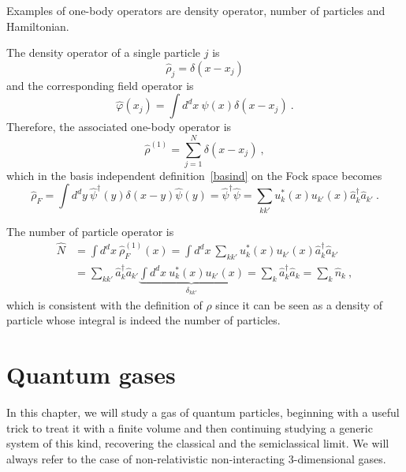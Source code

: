     Examples of one-body operators are density operator, number of particles and Hamiltonian.

    The density operator of a single particle $j$ is 
    \begin{equation*}
        \hat \rho_j = \delta (x - x_j)
    \end{equation*}
    and the corresponding field operator is 
    \begin{equation*}
        \hat \varphi (x_j) = \int d^d x ~ \psi (x) \delta (x - x_j) ~.
    \end{equation*}
    Therefore, the associated one-body operator is 
    \begin{equation*}
        \hat \rho^{(1)} = \sum_{j=1}^{N} \delta (x - x_j) ~,
    \end{equation*}
    which in the basis independent definition~\eqref{basind} on the Fock space becomes
    \begin{equation*}
        \hat \rho_F = \int d^d y ~ \hat \psi^\dagger (y) \delta (x - y) \hat \psi (y) = \hat \psi^\dagger \hat \psi = \sum_{kk'} u_k^* (x) u_{k'} (x) \hat a^\dagger_k \hat a_{k'} ~.
    \end{equation*}

    The number of particle operator is 
    \begin{equation*}
    \begin{aligned}
        \hat N & = \int d^d x ~ \hat \rho^{(1)}_F (x) = \int d^d x ~ \sum_{kk'} u^*_k (x) u_{k'} (x) \hat a^\dagger_k \hat a_{k'} \\ & = \sum_{kk'} \hat a^\dagger_k \hat a_{k'} \underbrace{\int d^d x ~ u^*_k (x) u_{k'} (x)}_{\delta_{kk'}} = \sum_k \hat a^\dagger_k \hat a_k = \sum_k \hat n_k ~,
    \end{aligned}
    \end{equation*}
    which is consistent with the definition of $\rho$ since it can be seen as a density of particle whose integral is indeed the number of particles.

\chapter{Quantum gases}

    In this chapter, we will study a gas of quantum particles, beginning with a useful trick to treat it with a finite volume and then continuing studying a generic system of this kind, recovering the classical and the semiclassical limit. We will always refer to the case of non-relativistic non-interacting $3$-dimensional gases.

